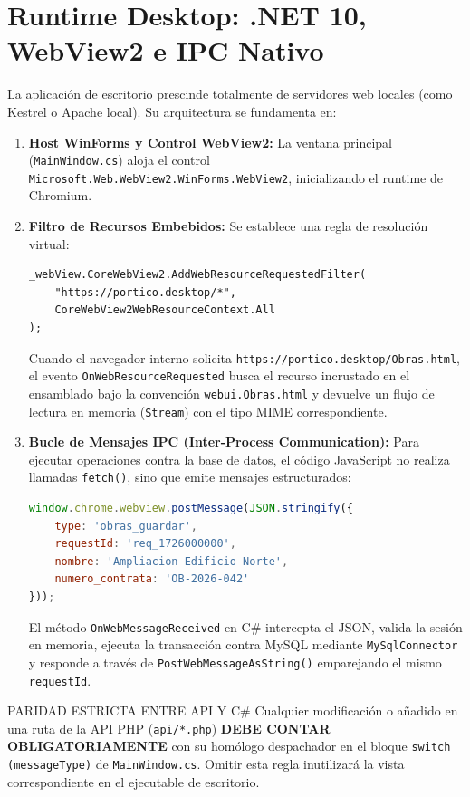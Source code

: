 \documentclass[11pt,a4paper,openany]{report}
\begin{document}
\section{Runtime Desktop: .NET 10, WebView2 e IPC Nativo}

La aplicación de escritorio prescinde totalmente de servidores web locales (como Kestrel o Apache local). Su arquitectura se fundamenta en:
\begin{enumerate}
    \item \textbf{Host WinForms y Control WebView2:} La ventana principal (\texttt{MainWindow.cs}) aloja el control \texttt{Microsoft.Web.WebView2.WinForms.WebView2}, inicializando el runtime de Chromium.
    \item \textbf{Filtro de Recursos Embebidos:} Se establece una regla de resolución virtual:
    \begin{lstlisting}[language={[Sharp]C}]
_webView.CoreWebView2.AddWebResourceRequestedFilter(
    "https://portico.desktop/*", 
    CoreWebView2WebResourceContext.All
);
    \end{lstlisting}
    Cuando el navegador interno solicita \texttt{https://portico.desktop/Obras.html}, el evento \texttt{OnWebResourceRequested} busca el recurso incrustado en el ensamblado bajo la convención \texttt{webui.Obras.html} y devuelve un flujo de lectura en memoria (\texttt{Stream}) con el tipo MIME correspondiente.
    \item \textbf{Bucle de Mensajes IPC (Inter-Process Communication):} Para ejecutar operaciones contra la base de datos, el código JavaScript no realiza llamadas \texttt{fetch()}, sino que emite mensajes estructurados:
    \begin{lstlisting}[language=javascript]
window.chrome.webview.postMessage(JSON.stringify({
    type: 'obras_guardar',
    requestId: 'req_1726000000',
    nombre: 'Ampliacion Edificio Norte',
    numero_contrata: 'OB-2026-042'
}));
    \end{lstlisting}
    El método \texttt{OnWebMessageReceived} en C\# intercepta el JSON, valida la sesión en memoria, ejecuta la transacción contra MySQL mediante \texttt{MySqlConnector} y responde a través de \texttt{PostWebMessageAsString()} emparejando el mismo \texttt{requestId}.
\end{enumerate}

\begin{alertbox}{PARIDAD ESTRICTA ENTRE API Y C\#}
Cualquier modificación o añadido en una ruta de la API PHP (\texttt{api/*.php}) \textbf{DEBE CONTAR OBLIGATORIAMENTE} con su homólogo despachador en el bloque \texttt{switch (messageType)} de \texttt{MainWindow.cs}. Omitir esta regla inutilizará la vista correspondiente en el ejecutable de escritorio.
\end{alertbox}
\end{document}
